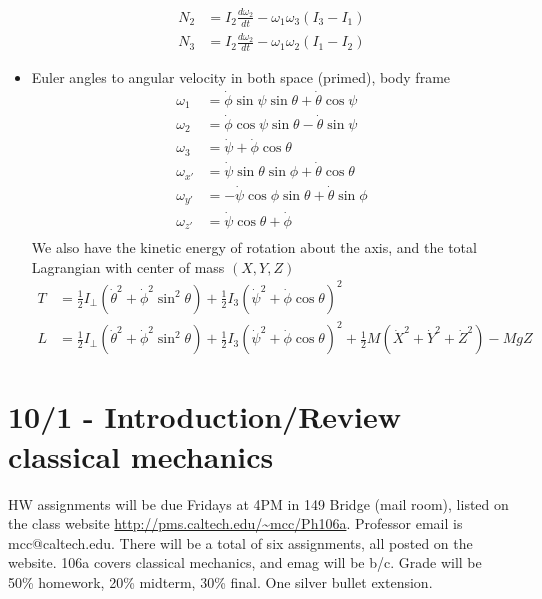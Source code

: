 \documentclass[10pt]{report}
\newcommand{\rd}[2]{\frac{d#1}{d#2}}
\begin{document}
\begin{itemize}
\begin{align*}
            N_2 &= I_2 \rd{\omega_2}{t} - \omega_1 \omega_3 \left( I_3 - I_1 \right)\\
            N_3 &= I_2 \rd{\omega_2}{t} - \omega_1 \omega_2 \left( I_1 - I_2 \right)
        \end{align*}
    \item Euler angles to angular velocity in both space (primed), body frame
        \begin{align*}
            \omega_1 &= \dot{\phi}\sin \psi\sin\theta + \dot{\theta}\cos\psi\\
            \omega_2 &= \dot{\phi}\cos\psi\sin\theta - \dot{\theta}\sin\psi\\
            \omega_3 &= \dot{\psi} + \dot{\phi}\cos \theta\\
            \omega_{x'} &= \dot{\psi}\sin\theta\sin\phi + \dot{\theta}\cos\theta\\
            \omega_{y'} &= -\dot{\psi}\cos\phi\sin\theta + \dot{\theta}\sin\phi\\
            \omega_{z'} &= \dot{\psi}\cos \theta + \dot{\phi}\\
        \end{align*}
        We also have the kinetic energy of rotation about the axis, and the total Lagrangian with center of mass $(X,Y,Z)$
        \begin{align*}
            T &= \frac{1}{2}I_{\perp} \left( \dot{\theta}^2 + \dot{\phi}^2 \sin^2\theta \right) + \frac{1}{2}I_3 \left( \dot{\psi}^2 + \dot{\phi}\cos\theta \right)^2\\
            L &= \frac{1}{2}I_{\perp} \left( \dot{\theta}^2 + \dot{\phi}^2 \sin^2\theta \right) + \frac{1}{2}I_3 \left( \dot{\psi}^2 + \dot{\phi}\cos\theta \right)^2 + \frac{1}{2}M(\dot{X}^2 + \dot{Y}^2 + \dot{Z}^2)- MgZ
        \end{align*}
\end{itemize}

\chapter{10/1 - Introduction/Review classical mechanics}

HW assignments will be due Fridays at 4PM in 149 Bridge (mail room), listed on the class website \url{http://pms.caltech.edu/~mcc/Ph106a}. Professor email is mcc@caltech.edu. There will be a total of six assignments, all posted on the website. 106a covers classical mechanics, and emag will be b/c. Grade will be 50\% homework, 20\% midterm, 30\% final. One silver bullet extension.
\end{document}
